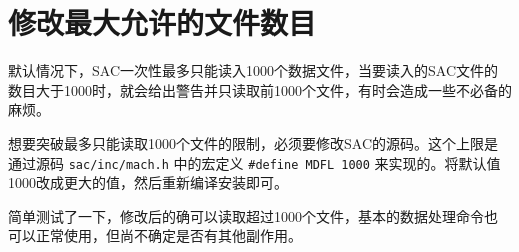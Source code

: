 \section{修改最大允许的文件数目}
\label{sec:mdfl}
默认情况下，SAC一次性最多只能读入1000个数据文件，当要读入的SAC文件的
数目大于1000时，就会给出警告并只读取前1000个文件，有时会造成一些不必备的
麻烦。

想要突破最多只能读取1000个文件的限制，必须要修改SAC的源码。这个上限是
通过源码 \verb+sac/inc/mach.h+ 中的宏定义 \verb+#define MDFL 1000+
来实现的。将默认值1000改成更大的值，然后重新编译安装即可。

简单测试了一下，修改后的确可以读取超过1000个文件，基本的数据处理命令也
可以正常使用，但尚不确定是否有其他副作用。
